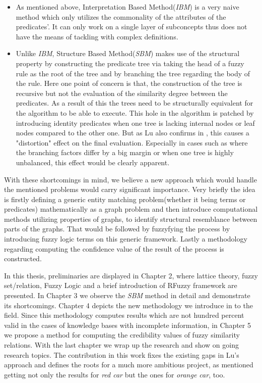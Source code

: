 \documentclass[egilmezThesis.tex]{subfiles}
\begin{document}
\begin{itemize}
\item As mentioned above, Interpretation Based Method(\textit{IBM}) is a very naive method which only utilizes the commonality of the attributes of the predicates'.  It can only work on a single layer of subconcepts thus does not have the means of tackling with complex definitions.
\item Unlike \textit{IBM}, Structure Based Method(\textit{SBM}) makes use of the structural property by constructing the predicate tree via taking the head of a fuzzy rule as the root of the tree and by branching the tree regarding the body of the rule. Here one point of concern is that, the construction of the tree is recursive but not the evaluation of the similarity degree between the predicates. As a result of this the trees need to be structurally equivalent for the algorithm to be able to execute.  This hole in the algorithm is patched by introducing identity predicates when one tree is lacking internal nodes or leaf nodes compared to the other one. But as Lu also confirms in \cite{Lu}, this causes a "distortion" effect on the final evaluation. Especially in cases such as where the branching factors  differ by a big margin or when one tree is highly unbalanced, this effect would be clearly apparent.
 \end{itemize}
 
With these shortcomings in mind, we believe a new approach which would handle the mentioned problems would carry significant importance. Very briefly the idea is firstly defining a generic entity matching problem(whether it being terms or predicates) mathematically as a graph problem and then introduce computational methods utilizing properties of graphs, to identify structural resemblance between parts of the graphs. That would be followed by fuzzyfying the process by introducing fuzzy logic terms on this generic framework. Lastly a methodology regarding computing the confidence value of the result of the process is constructed.

In this thesis, preliminaries are displayed in Chapter 2, where lattice theory, fuzzy set/relation, Fuzzy Logic and  a brief introduction of RFuzzy framework are presented.  In Chapter 3 we observe the \textit{SBM} method \cite{Lu} in detail and demonstrate its shortcomings. Chapter 4 depicts the new methodology we introduce in to the field. Since this methodology computes results which are not hundred percent valid in the cases of knowledge bases with incomplete information, in Chapter 5 we propose a method for computing the credibility values of fuzzy similarity relations. With the last chapter we wrap up the research and show on going research topics.
The contribution in this work fixes the existing gaps in Lu's approach \cite{Lu} and defines the roots for a much more ambitious project, as mentioned getting not only the results for \textit{red car} but the ones for \textit{orange car}, too.
\end{document}
